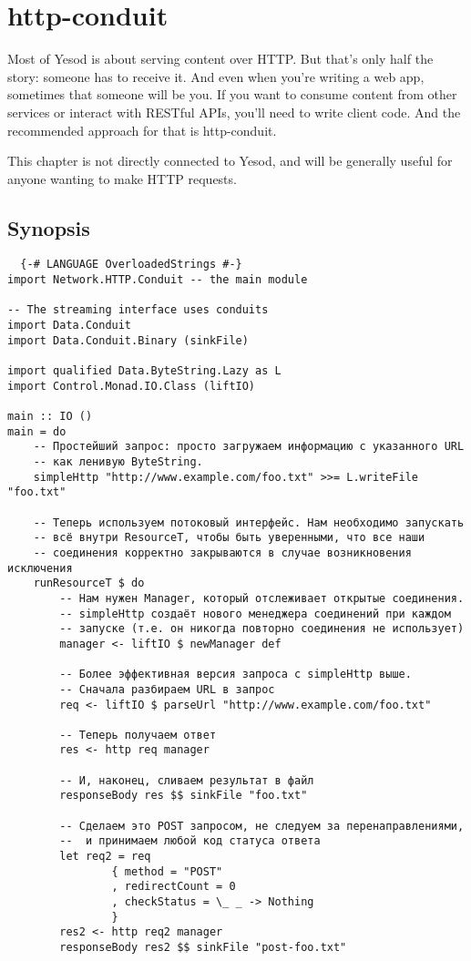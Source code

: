 \chapter{http-conduit}

Most of Yesod is about serving content over HTTP. But that's only half
the story: someone has to receive it. And even when you're writing a
web app, sometimes that someone will be you. If you want to consume
content from other services or interact with RESTful APIs, you'll need
to write client code. And the recommended approach for that is
http-conduit.

This chapter is not directly connected to Yesod, and will be generally
useful for anyone wanting to make HTTP requests.

\section{Synopsis}
\begin{lstlisting}
  {-# LANGUAGE OverloadedStrings #-}
import Network.HTTP.Conduit -- the main module

-- The streaming interface uses conduits
import Data.Conduit
import Data.Conduit.Binary (sinkFile)

import qualified Data.ByteString.Lazy as L
import Control.Monad.IO.Class (liftIO)

main :: IO ()
main = do
    -- Простейший запрос: просто загружаем информацию с указанного URL
    -- как ленивую ByteString.
    simpleHttp "http://www.example.com/foo.txt" >>= L.writeFile "foo.txt"

    -- Теперь используем потоковый интерфейс. Нам необходимо запускать
    -- всё внутри ResourceT, чтобы быть уверенными, что все наши
    -- соединения корректно закрываются в случае возникновения исключения
    runResourceT $ do
        -- Нам нужен Manager, который отслеживает открытые соединения.
        -- simpleHttp создаёт нового менеджера соединений при каждом
        -- запуске (т.е. он никогда повторно соединения не использует)
        manager <- liftIO $ newManager def

        -- Более эффективная версия запроса с simpleHttp выше.
        -- Сначала разбираем URL в запрос
        req <- liftIO $ parseUrl "http://www.example.com/foo.txt"

        -- Теперь получаем ответ
        res <- http req manager

        -- И, наконец, сливаем результат в файл
        responseBody res $$ sinkFile "foo.txt"

        -- Сделаем это POST запросом, не следуем за перенаправлениями,
        --  и принимаем любой код статуса ответа
        let req2 = req
                { method = "POST"
                , redirectCount = 0
                , checkStatus = \_ _ -> Nothing
                }
        res2 <- http req2 manager
        responseBody res2 $$ sinkFile "post-foo.txt"
\end{lstlisting} %

